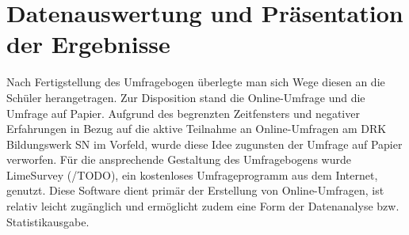 \section{Datenauswertung und Präsentation der Ergebnisse}
\label{sec:DatenauswertungUndPräsentationDerErgebnisse}

Nach Fertigstellung des Umfragebogen überlegte man sich Wege diesen an die Schüler herangetragen. Zur Disposition stand die Online-Umfrage und die Umfrage auf Papier. Aufgrund des begrenzten Zeitfensters und negativer Erfahrungen in Bezug auf die aktive Teilnahme an Online-Umfragen am DRK Bildungswerk SN  im Vorfeld, wurde diese Idee zugunsten der Umfrage auf Papier verworfen. Für die ansprechende Gestaltung des Umfragebogens wurde LimeSurvey (/TODO), ein kostenloses Umfrageprogramm aus dem Internet, genutzt. Diese Software dient primär der Erstellung von Online-Umfragen, ist relativ leicht zugänglich und ermöglicht zudem eine Form der Datenanalyse bzw. Statistikausgabe. 